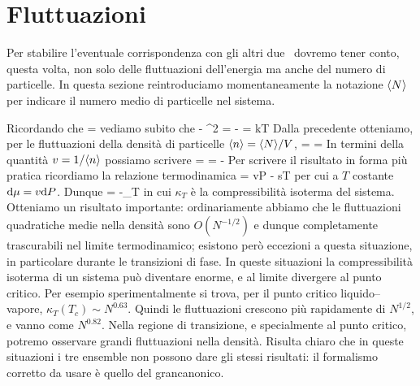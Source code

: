 \section{Fluttuazioni}
\label{sec:05-fluttuazioni}

Per stabilire l'eventuale corrispondenza con gli altri due \ensembles\ dovremo tener conto, questa volta, non solo delle fluttuazioni dell'energia ma anche del numero di particelle. In questa sezione reintroduciamo momentaneamente la notazione $\langle N\rangle$ per indicare il numero medio di particelle nel sistema.

Ricordando che
\be
{} = 
\ee
vediamo subito che
\be
{} \equiv {} - ^2 = - = kT
\ee
Dalla precedente otteniamo, per le fluttuazioni della densità di particelle $\langle n\rangle = \langle N\rangle/V$,
\be
{} =  = 
\ee
In termini della quantità $v = 1/\langle n\rangle$ possiamo scrivere
\be
{} =  = -
\ee
Per scrivere il risultato in forma più pratica ricordiamo la relazione termodinamica
\be
\de\mu = v\de P - s\de T
\ee
per cui a $T$ costante ${\textrm d}\mu = v{\textrm d}P$. Dunque
\be
\label{eq:05-fluttNGran}
 = - \equiv {}\kappa_T
\ee
in cui $\kappa_T$ è la compressibilità isoterma del sistema. Otteniamo un risultato importante: ordinariamente abbiamo che le fluttuazioni quadratiche medie nella densità sono $O(N^{-1/2})$ e dunque completamente trascurabili nel limite termodinamico; esistono però eccezioni a questa situazione, in particolare durante le transizioni di fase. In queste situazioni la compressibilità isoterma di un sistema può diventare enorme, e al limite divergere al punto critico. Per esempio sperimentalmente si trova, per il punto critico liquido--vapore, $\kappa_T(T_c) \sim N^{0.63}$. Quindi le fluttuazioni crescono più rapidamente di $N^{1/2}$, e vanno come $N^{0.82}$. Nella regione di transizione, e specialmente al punto critico, potremo osservare grandi fluttuazioni nella densità. Risulta chiaro che in queste situazioni i tre ensemble non possono dare gli stessi risultati: il formalismo corretto da usare è quello del grancanonico.

